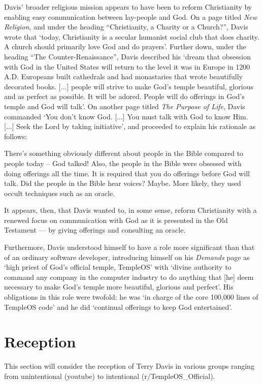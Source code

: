 \documentclass[Draft.tex]{subfiles}
\begin{document}
Davis' broader religious mission appears to have been to reform
Christianity by enabling easy communication between lay-people and God.
On a page titled \textit{New Religion}, and under the heading
``Christianity, a Charity or a Church?'', Davis \parencite*{NewReligion}
wrote that `today, Christianity is a secular humanist social club
that does charity.  A church should primarily love God and do prayers'.
Further down, under the heading ``The Counter-Renaissance'',
Davis described his `dream that obsession with God in the United States
will return to the level it was in Europe in 1200 A.D.
Europeans built cathedrals and had monastaries
that wrote beautifully decorated books. [...]
people will strive to make God's temple beautiful, glorious
and as perfect as possible.  It will be adored.
People will do offerings in God's temple and God will talk'.
On another page titled \textit{The Purpose of Life},
Davis \parencite*{PurposeLife} commanded `You don't know God. [...]
You must talk with God to know Him. [...] Seek the Lord by taking initiative',
and proceeded to explain his rationale as follows:
\begin{displayquote}
	There's something obviously different about people in the Bible
	compared to people today -- God talked!
	Also, the people in the Bible were obsessed with doing offerings all the time.
	It is required that you do offerings before God will talk.
	Did the people in the Bible hear voices?  Maybe.
	More likely, they used occult techniques such as an oracle.
\end{displayquote}
It appears, then, that Davis wanted to, in some sense, reform Christianity
with a renewed focus on communication with God
as it is presented in the Old Testament ---
by giving offerings and consulting an oracle.

Furthermore, Davis \parencite*{Demands} understood himself to have a role
more significant than that of an ordinary software developer,
introducing himself on his \textit{Demands} page as
`high priest of God's official temple, TempleOS' with
`divine authority to command any company in the computer industry
to do anything that [he] deem necessary to make God's temple
more beautiful, glorious and perfect'.
His obligations in this role were twofold: he was
`in charge of the core 100,000 lines of TempleOS code'
and he did `continual offerings to keep God entertained'.


\section*{Reception}
This section will consider the reception of Terry Davis in various groups
ranging from unintentional (youtube) to intentional (r/TempleOS\_Official).
\end{document}
